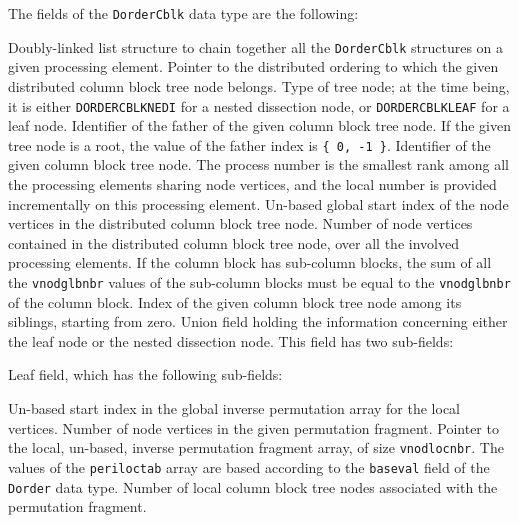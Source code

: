 The fields of the \texttt{DorderCblk} data type are the following:
\begin{itemize}
  Doubly-linked list structure to chain together all
  the \texttt{Dorder\lbt Cblk} structures on a given processing
  element.
  Pointer to the distributed ordering to which the given distributed
  column block tree node belongs.
  Type of tree node; at the time being, it is either
  \texttt{DORDER\lbt CBLK\lbt NEDI} for a nested dissection node, or
  \texttt{DORDER\lbt CBLK\lbt LEAF} for a leaf node.
  Identifier of the father of the given column block tree node. If the
  given tree node is a root, the value of the father index is
  \texttt{\{~0, -1~\}}.
  Identifier of the given column block tree node. The process number
  is the smallest rank among all the processing elements sharing node
  vertices, and the local number is provided incrementally on this
  processing element.
  Un-based global start index of the node vertices in the distributed
  column block tree node.
  Number of node vertices contained in the distributed column block
  tree node, over all the involved processing elements. If the
  column block has sub-column blocks, the sum of all the
  \texttt{vnodglbnbr} values of the sub-column blocks must be equal to
  the \texttt{vnodglbnbr} of the column block.
  Index of the given column block tree node among its siblings,
  starting from zero.
  Union field holding the information concerning either the leaf node
  or the nested dissection node. This field has two sub-fields:
  \begin{itemize}
    Leaf field, which has the following sub-fields:
    \begin{itemize}
      Un-based start index in the global inverse permutation array for
      the local vertices.
      Number of node vertices in the given permutation fragment.
      Pointer to the local, un-based, inverse permutation fragment
      array, of size \texttt{vnod\lbt loc\lbt nbr}. The values of the
      \texttt{peri\lbt loc\lbt tab} array are based according to the
      \texttt{baseval} field of the \texttt{Dorder} data type.
      Number of local column block tree nodes associated with the
      permutation fragment.

\end{itemize}
\end{itemize}
\end{itemize}
